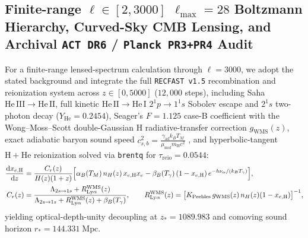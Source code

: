 \documentclass[11pt,a4paper]{article}
\begin{document}
\subsection{Finite-range \texorpdfstring{$\ell \in [2, 3000]$}{l in [2, 3000]} \texorpdfstring{$\ell_{\max} = 28$}{l\_max = 28} Boltzmann Hierarchy, Curved-Sky CMB Lensing, and Archival \texttt{ACT DR6} / \texttt{Planck PR3+PR4} Audit}
For a finite-range lensed-spectrum calculation through $\ell=3000$, we adopt the stated background and integrate the full \texttt{RECFAST v1.5} recombination and reionization system \cite{Peebles1968,Seager1999RECFAST,WongMossScott2008} across $z \in [0, 5000]$ ($12{,}000$ steps), including Saha $\mathrm{He\,III}\to\mathrm{He\,II}$, full kinetic $\mathrm{He\,II}\to\mathrm{He\,I}$ $2^1p\to 1^1s$ Sobolev escape and $2^1s$ two-photon decay ($Y_{\mathrm{He}} = 0.2454$), Seager's $F = 1.125$ case-B coefficient with the Wong--Moss--Scott double-Gaussian $\mathrm{H}$ radiative-transfer correction $g_{\mathrm{WMS}}(z)$, exact adiabatic baryon sound speed $c_{s,b}^2 = \frac{\gamma_{\mathrm{ad}}k_B T_M}{\mu_{\mathrm{mol}}m_{\mathrm{H}}c^2}$ \cite{MaBertschinger1995}, and hyperbolic-tangent $\mathrm{H}+\mathrm{He}$ reionization solved via \texttt{brentq} for $\tau_{\mathrm{reio}} = 0.0544$:
\begin{equation}
\begin{aligned}
  \frac{\mathrm{d}x_{e,\mathrm{H}}}{\mathrm{d}z} &= \frac{C_r(z)}{H(z)(1+z)}\Bigl[\alpha_B(T_M)\,n_H(z)\,x_{e,\mathrm{H}} x_e - \beta_B(T_\gamma)\,(1 - x_{e,\mathrm{H}})\,e^{-h\nu_\alpha/(k_B T_\gamma)}\Bigr], \\
  C_r(z) &= \frac{\Lambda_{2s\to 1s} + R_{\mathrm{Ly}\alpha}^{\mathrm{WMS}}(z)}{\Lambda_{2s\to 1s} + R_{\mathrm{Ly}\alpha}^{\mathrm{WMS}}(z) + \beta_B(T_\gamma)}, \qquad R_{\mathrm{Ly}\alpha}^{\mathrm{WMS}}(z) = \bigl[K_{\mathrm{Peebles}}\,g_{\mathrm{WMS}}(z)\,n_H(z)(1 - x_{e,\mathrm{H}})\bigr]^{-1},
\end{aligned}
\label{eq:recfast}
\end{equation}
yielding optical-depth-unity decoupling at $z_* = \mathbf{1089.983}$ and comoving sound horizon $r_* = \mathbf{144.331\;\mathrm{Mpc}}$.
\end{document}
